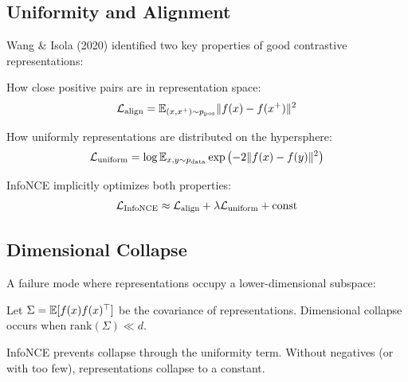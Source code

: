 \begin{notechapter}
\subsection{Uniformity and Alignment}

Wang \& Isola (2020) identified two key properties of good contrastive representations:

\begin{definition}[Alignment]
How close positive pairs are in representation space:
\begin{equation}
\mathcal{L}_{\text{align}} = \mathbb{E}_{(x, x^+) \sim p_{\text{pos}}} \|f(x) - f(x^+)\|^2
\end{equation}
\end{definition}

\begin{definition}[Uniformity]
How uniformly representations are distributed on the hypersphere:
\begin{equation}
\mathcal{L}_{\text{uniform}} = \log \mathbb{E}_{x, y \sim p_{\text{data}}} \exp\left(-2\|f(x) - f(y)\|^2\right)
\end{equation}
\end{definition}

\begin{theorem}
InfoNCE implicitly optimizes both properties:
\begin{equation}
\mathcal{L}_{\text{InfoNCE}} \approx \mathcal{L}_{\text{align}} + \lambda \mathcal{L}_{\text{uniform}} + \text{const}
\end{equation}
\end{theorem}

\subsection{Dimensional Collapse}

A failure mode where representations occupy a lower-dimensional subspace:

\begin{definition}
Let $\Sigma = \mathbb{E}[f(x)f(x)^\top]$ be the covariance of representations. Dimensional collapse occurs when $\text{rank}(\Sigma) \ll d$.
\end{definition}

\begin{proposition}
InfoNCE prevents collapse through the uniformity term. Without negatives (or with too few), representations collapse to a constant.
\end{proposition}


\end{notechapter}
